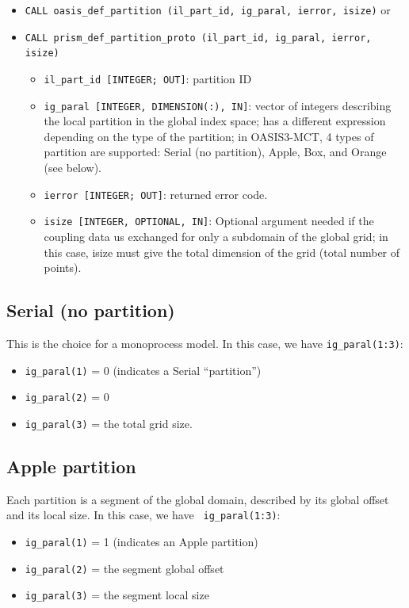 \begin{itemize}

\vspace{0.2cm}
\item {\tt CALL oasis\_def\_partition        (il\_part\_id, ig\_paral, ierror, isize)}
 or 
\item {\tt CALL prism\_def\_partition\_proto (il\_part\_id, ig\_paral, ierror, isize)}

   \begin{itemize}
   \item {\tt il\_part\_id [INTEGER; OUT]}: partition ID 
   \item {\tt ig\_paral [INTEGER, DIMENSION(:), IN]}: vector of
   integers describing the local partition in the global index space; has a different expression depending on the type of the
partition; in OASIS3-MCT, 4 types of partition are supported: Serial (no
partition), Apple, Box, and Orange (see below).
   \item {\tt ierror [INTEGER; OUT]}: returned error code.
   \item {\tt isize [INTEGER, OPTIONAL, IN]}: Optional argument needed if the coupling data us exchanged for only a subdomain of the global grid; in this case, isize must give the total dimension of the grid (total number of points).
   \end{itemize}
\end{itemize} 

\subsection{Serial (no partition)}

This is the choice for a monoprocess model. In this case, we have 
{\tt ig\_paral(1:3)}:
\begin{itemize}
 \item {\tt ig\_paral(1)} = 0 (indicates a Serial ``partition'')
 \item {\tt ig\_paral(2)} = 0
 \item {\tt ig\_paral(3)} = the total grid size.
\end{itemize}

\subsection{Apple partition} 

Each partition is a segment of the global domain, described by its
global offset and its local size. In this case, we have {\tt
ig\_paral(1:3)}:
\begin{itemize}
 \item {\tt ig\_paral(1)} = 1 (indicates an Apple partition)
 \item {\tt ig\_paral(2)} = the segment global offset
 \item {\tt ig\_paral(3)} = the segment local size
\end{itemize}

